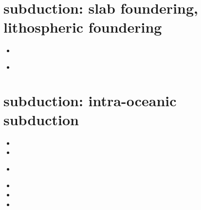 \section{subduction: slab foundering, lithospheric foundering}

\begin{small}
\begin{itemize}
\item[\twothousand]
\item[\twothousandtwentythree]
 \\
\end{itemize}
\end{small}



\section{subduction: intra-oceanic subduction}

\begin{small}
\begin{itemize}
\item[\twothousandeleven]
\item[\twothousandthirteen]
\item[\twothousandfifteen]
 \\
\item[\twothousandnineteen]
\item[\twothousandtwentytwo]
\item[\twothousandtwentyfour]
\end{itemize}
\end{small}




